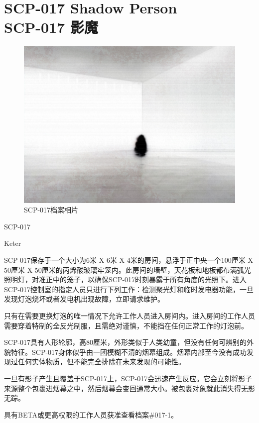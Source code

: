 \chapter[SCP-017 影魔]{
    SCP-017 Shadow Person\\
    SCP-017 影魔
}

\label{chap:SCP-017}

\begin{figure}[H]
    \centering
    \includegraphics[width=0.5\linewidth]{images/SCP.017.jpg}
    \caption*{SCP-017档案相片}
\end{figure}

SCP-017

Keter

SCP-017保存于一个大小为6米 X 6米 X 4米的房间，悬浮于正中央一个100厘米 X 50厘米 X 50厘米的丙烯酸玻璃牢笼内。此房间的墙壁，天花板和地板都布满弧光照明灯，对准正中的笼子，以确保SCP-017时刻暴露于所有角度的光照下。进入SCP-017控制室的指定人员只进行下列工作：检测聚光灯和临时发电器功能，一旦发现灯泡烧坏或者发电机出现故障，立即请求维护。

只有在需要更换灯泡的唯一情况下允许工作人员进入房间内。进入房间的工作人员需要穿着特制的全反光制服，且需绝对谨慎，不能挡在任何正常工作的灯泡前。

SCP-017具有人形轮廓，高80厘米，外形类似于人类幼童，但没有任何可辨别的外貌特征。SCP-017身体似乎由一团模糊不清的烟幕组成。烟幕内部至今没有成功发现过任何实体物质，但不能完全排除在未来发现的可能性。

一旦有影子产生且覆盖于SCP-017上，SCP-017会迅速产生反应。它会立刻将影子来源整个包裹进烟幕之中，然后烟幕会变回通常大小。被包裹对象就此消失得无影无踪。

具有BETA或更高权限的工作人员获准查看档案\#017-1。

